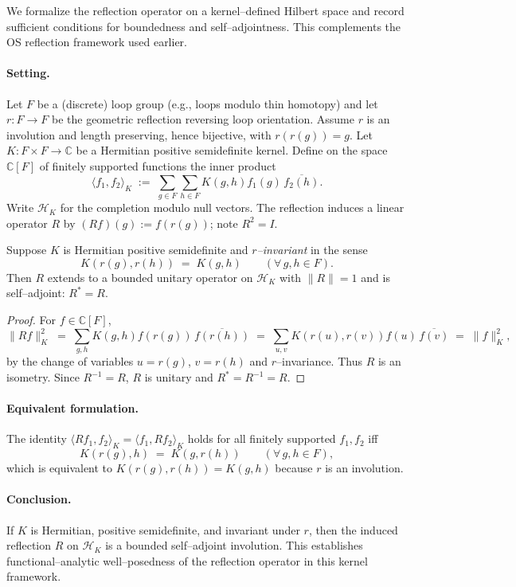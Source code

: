 \documentclass[11pt]{amsart}
\begin{document}
We formalize the reflection operator on a kernel--defined Hilbert space and record sufficient conditions for boundedness and self--adjointness. This complements the OS reflection framework used earlier.

\paragraph{Setting.}
Let $F$ be a (discrete) loop group (e.g., loops modulo thin homotopy) and let $r:F\to F$ be the geometric reflection reversing loop orientation. Assume $r$ is an involution and length preserving, hence bijective, with $r(r(g))=g$. Let $K:F\times F\to\mathbb{C}$ be a Hermitian positive semidefinite kernel. Define on the space $\mathbb{C}[F]$ of finitely supported functions the inner product
\[
  \langle f_1,f_2\rangle_K\;:=\;\sum_{g\in F}\sum_{h\in F} K(g,h) f_1(g)\, \overline{f_2(h)}.
\]
Write $\mathcal{H}_K$ for the completion modulo null vectors. The reflection induces a linear operator $R$ by $(Rf)(g):=f(r(g))$; note $R^2=I$.

\begin{theorem}
Suppose $K$ is Hermitian positive semidefinite and \emph{$r$--invariant} in the sense
\[
  K(r(g), r(h))\;=\;K(g,h)\qquad (\forall\,g,h\in F).
\]
Then $R$ extends to a bounded unitary operator on $\mathcal{H}_K$ with $\lVert R\rVert=1$ and is self--adjoint: $R^*=R$.
\end{theorem}

\begin{proof}
For $f\in\mathbb{C}[F]$,
\[
  \lVert Rf\rVert_K^2\;=\;\sum_{g,h} K(g,h) f(r(g))\,\overline{f(r(h))}
  \;=\;\sum_{u,v} K(r(u),r(v)) f(u)\,\overline{f(v)}\;=\;\lVert f\rVert_K^2,
\]
by the change of variables $u=r(g)$, $v=r(h)$ and $r$--invariance. Thus $R$ is an isometry. Since $R^{-1}=R$, $R$ is unitary and $R^*=R^{-1}=R$.
\end{proof}

\paragraph{Equivalent formulation.}
The identity $\langle Rf_1,f_2\rangle_K=\langle f_1,Rf_2\rangle_K$ holds for all finitely supported $f_1,f_2$ iff
\[
  K(r(g),h)\;=\;K(g,r(h))\qquad (\forall\,g,h\in F),
\]
which is equivalent to $K(r(g),r(h))=K(g,h)$ because $r$ is an involution.

\paragraph{Conclusion.}
If $K$ is Hermitian, positive semidefinite, and invariant under $r$, then the induced reflection $R$ on $\mathcal{H}_K$ is a bounded self--adjoint involution. This establishes functional--analytic well--posedness of the reflection operator in this kernel framework.
\end{document}
